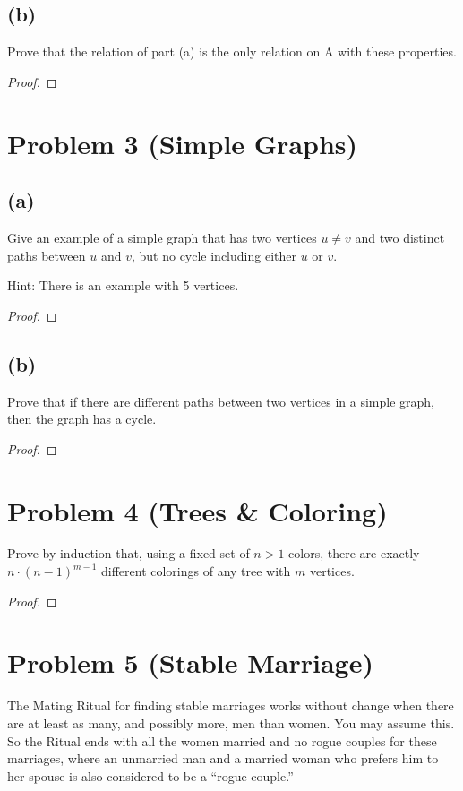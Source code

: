 \documentclass[14pt]{extarticle}
\begin{document}
\subsection{(b)}
Prove that the relation of part (a) is the only relation on A with these properties.
\begin{proof}
\end{proof}

\section{Problem 3 (Simple Graphs)}
\subsection{(a)}
Give an example of a simple graph that has two vertices $u \neq v$ and two distinct paths between $u$ and $v$, but no cycle including either $u$ or $v$.

Hint: There is an example with 5 vertices.
\begin{proof}
\end{proof}

\subsection{(b)}
Prove that if there are different paths between two vertices in a simple graph, then the graph has a cycle.
\begin{proof}
\end{proof}

\section{Problem 4 (Trees \& Coloring)}
Prove by induction that, using a fixed set of $n > 1$ colors, there are exactly $n\cdot(n-1)^{m-1}$ different colorings of any tree with $m$ vertices.
\begin{proof}
\end{proof}

\section{Problem 5 (Stable Marriage)}
The Mating Ritual for finding stable marriages works without change when there are at least as many, and possibly more, men than women. You may assume this. So the Ritual ends with all the women married and
no rogue couples for these marriages, where an unmarried man and a married woman who prefers him to her spouse is also considered to be a ``rogue couple.''
\end{document}
